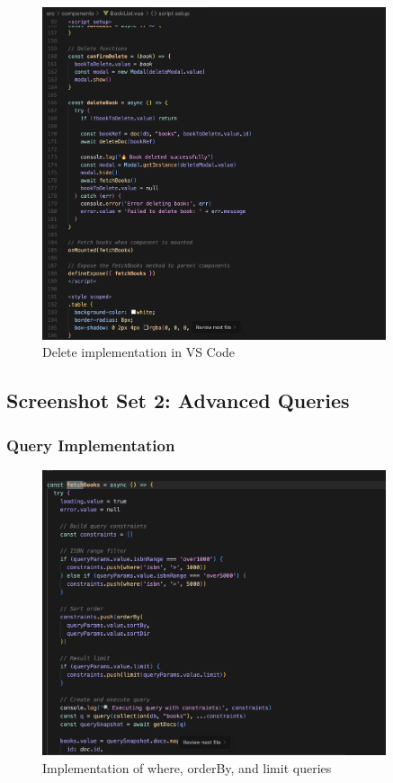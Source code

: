 \documentclass[11pt,a4paper]{article}
\begin{document}
 \begin{figure}[H]
     \centering
     \includegraphics[width=0.9\textwidth]{delete_book_code.png}
     \caption{Delete implementation in VS Code}
     \label{fig:delete_book_code}
 \end{figure}

\subsection{Screenshot Set 2: Advanced Queries}

\subsubsection{Query Implementation}
 \begin{figure}[H]
     \centering
     \includegraphics[width=0.9\textwidth]{query_implementation.png}
     \caption{Implementation of where, orderBy, and limit queries}
     \label{fig:query_implementation}
 \end{figure}
\end{document}
